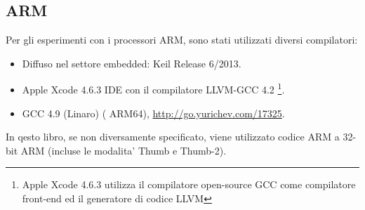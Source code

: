 \subsection{ARM}
\label{sec:hw_ARM}

\myindex{\idevices}
Per gli esperimenti con i processori ARM, sono stati utilizzati diversi compilatori:

\begin{itemize}
\item Diffuso nel settore embedded: Keil Release 6/2013.

\item Apple Xcode 4.6.3 IDE con il compilatore LLVM-GCC 4.2
\footnote{Apple Xcode 4.6.3 utilizza il compilatore open-source GCC come compilatore front-end ed il generatore di codice LLVM}.

\item GCC 4.9 (Linaro) (\ITAph{} ARM64), \ITAph{} \url{http://go.yurichev.com/17325}.

\end{itemize}

In qesto libro, se non diversamente specificato, viene utilizzato codice ARM a 32-bit ARM (incluse le modalita' Thumb e Thumb-2).
\ITAph{}



